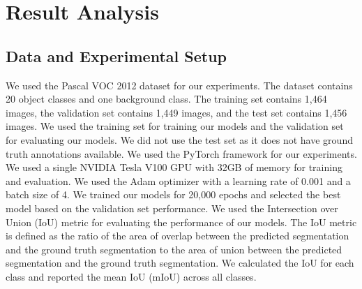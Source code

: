 
\chapter{Result Analysis}
\label{sec:result_analysis}





\section{Data and Experimental Setup}
\label{subsec: Data and Experimental setup}
We used the Pascal VOC 2012 dataset \cite{pascal_voc} for our experiments. The dataset contains 20 object classes and one background class. The training set contains 1,464 images, the validation set contains 1,449 images, and the test set contains 1,456 images. We used the training set for training our models and the validation set for evaluating our models. We did not use the test set as it does not have ground truth annotations available.
We used the PyTorch framework for our experiments. We used a single NVIDIA Tesla V100 GPU with 32GB of memory for training and evaluation. We used the Adam optimizer with a learning rate of 0.001 and a batch size of 4. We trained our models for 20,000 epochs and selected the best model based on the validation set performance. 
We used the Intersection over Union (IoU) metric for evaluating the performance of our models. The IoU metric is defined as the ratio of the area of overlap between the predicted segmentation and the ground truth segmentation to the area of union between the predicted segmentation and the ground truth segmentation. We calculated the IoU for each class and reported the mean IoU (mIoU) across all classes.

